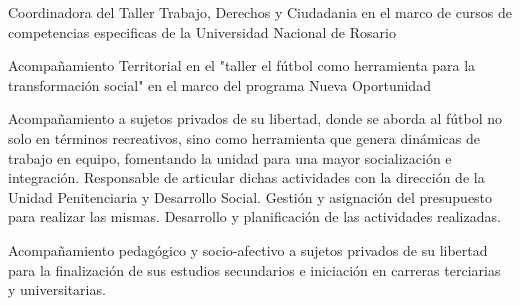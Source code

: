 \documentclass[11pt,a4paper,sans]{moderncv}        %
\begin{document}
  {
     Coordinadora del Taller Trabajo, Derechos y Ciudadania en el marco de cursos de competencias especificas de la Universidad Nacional de Rosario
  }
\vspace{3mm}

  {
  }
\vspace{3mm}

  {
    Acompañamiento Territorial en el "taller el fútbol como herramienta para la transformación social" en el marco del programa Nueva Oportunidad
  }
\vspace{3mm}

  {
    Acompañamiento a sujetos privados de su libertad, donde se aborda al fútbol no solo en términos recreativos, sino como herramienta que genera dinámicas de trabajo en equipo, fomentando la unidad para una mayor socialización e integración.
    Responsable de articular dichas actividades con la dirección de la Unidad Penitenciaria y Desarrollo Social. Gestión y asignación del presupuesto para realizar las mismas. Desarrollo y planificación de las actividades realizadas.
  }
\vspace{3mm}

  {
    Acompañamiento pedagógico y socio-afectivo a sujetos privados de su libertad para la finalización de sus estudios secundarios e iniciación en carreras terciarias y universitarias.
  }
\vspace{3mm}

  {}
\vspace{3mm}
\end{document}
